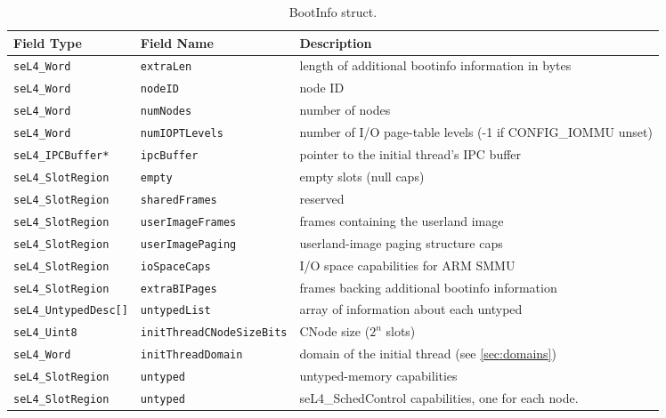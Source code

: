 \begin{table}[htb]
  \begin{center}
    \caption{BootInfo struct.}
    \label{tab:bootinfo_struct}
    \begin{tabularx}{\textwidth}{llX}
      \toprule
      Field Type & Field Name & Description \\
      \midrule
      \texttt{seL4\_Word}           & \texttt{extraLen}                & length of additional bootinfo information in bytes \\
      \texttt{seL4\_Word}           & \texttt{nodeID}                  & node ID \\
      \texttt{seL4\_Word}           & \texttt{numNodes}                & number of nodes \\
      \texttt{seL4\_Word}           & \texttt{numIOPTLevels}           & number of I/O page-table levels (-1 if CONFIG\_IOMMU unset) \\
      \texttt{seL4\_IPCBuffer*}     & \texttt{ipcBuffer}               & pointer to the initial thread's IPC buffer \\
      \texttt{seL4\_SlotRegion}     & \texttt{empty}                   & empty slots (null caps) \\
      \texttt{seL4\_SlotRegion}     & \texttt{sharedFrames}            & reserved \\
      \texttt{seL4\_SlotRegion}     & \texttt{userImageFrames}         & frames containing the userland image \\
      \texttt{seL4\_SlotRegion}     & \texttt{userImagePaging}         & userland-image paging structure caps \\
      \texttt{seL4\_SlotRegion}     & \texttt{ioSpaceCaps}             & I/O space capabilities for ARM SMMU \\
      \texttt{seL4\_SlotRegion}     & \texttt{extraBIPages}            & frames backing additional bootinfo information \\
      \texttt{seL4\_UntypedDesc[]}  & \texttt{untypedList}             & array of information about each untyped \\
      \texttt{seL4\_Uint8}          & \texttt{initThreadCNodeSizeBits} & CNode size ($2^n$ slots) \\
      \texttt{seL4\_Word}           & \texttt{initThreadDomain}        & domain of the initial thread (see \autoref{sec:domains}) \\
      \texttt{seL4\_SlotRegion}     & \texttt{untyped}                 & untyped-memory capabilities \\
      \texttt{seL4\_SlotRegion}   & \texttt{untyped}                 & seL4\_SchedControl capabilities, one for each node. \\
        \bottomrule
    \end{tabularx}
  \end{center}
\end{table}

